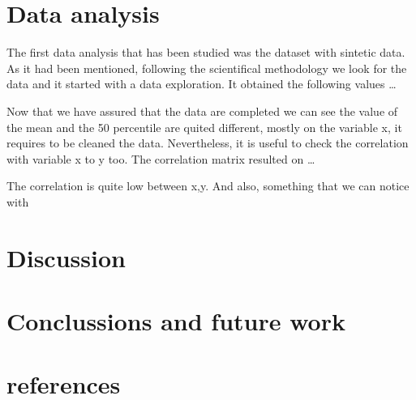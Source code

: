 \documentclass{article}
\begin{document}
\section{Data analysis}
The first data analysis that has been studied was the dataset with sintetic data. As it had been mentioned, following the scientifical methodology we look for the data and it started with a data exploration.
It obtained the following values \dots
\begin{table}[h]

\end{table}

Now that we have assured that the data are completed we can see the value of the mean and the 50 percentile are quited different, mostly on the variable x, it requires to be cleaned the data. Nevertheless, it is useful to check the correlation with variable x to y too.
The correlation matrix resulted on \dots

The correlation is quite low between x,y.
And also, something that we can notice with 
\section{Discussion}
\section{Conclussions and future work}
\section{references}
\end{document}
